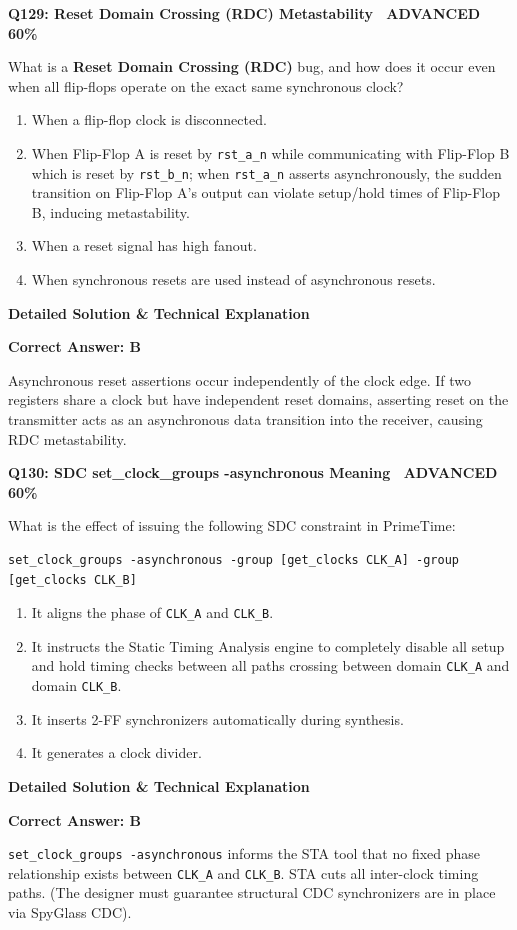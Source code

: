 \documentclass[11pt,a4paper]{article}
\newcommand{\badgeadv}{{\color{white}\colorbox{advred}{\bfseries\sffamily\tiny\ ADVANCED 60\%\ }}}
\newenvironment{qbox}[2]{%
  \begin{mdframed}[style=qstyle]%
  {\bfseries\sffamily\color{primaryblue}#1 \hfill #2}\par\vspace{2pt}%
}{%
  \end{mdframed}%
}
\newenvironment{ansbox}{%
  \begin{mdframed}[style=ansstyle]%
  {\bfseries\sffamily\color{ansgreen}\small Detailed Solution \& Technical Explanation}\par\vspace{2pt}\small%
}{%
  \end{mdframed}%
}
\begin{document}
\begin{qbox}{Q129: Reset Domain Crossing (RDC) Metastability}{\badgeadv}
What is a \textbf{Reset Domain Crossing (RDC)} bug, and how does it occur even when all flip-flops operate on the exact same synchronous clock?
\begin{enumerate}[label=\textbf{\Alph*.}]
  \item When a flip-flop clock is disconnected.
  \item When Flip-Flop A is reset by \texttt{rst\_a\_n} while communicating with Flip-Flop B which is reset by \texttt{rst\_b\_n}; when \texttt{rst\_a\_n} asserts asynchronously, the sudden transition on Flip-Flop A's output can violate setup/hold times of Flip-Flop B, inducing metastability.
  \item When a reset signal has high fanout.
  \item When synchronous resets are used instead of asynchronous resets.
\end{enumerate}
\end{qbox}
\begin{ansbox}
\textbf{Correct Answer: B}

Asynchronous reset assertions occur independently of the clock edge. If two registers share a clock but have independent reset domains, asserting reset on the transmitter acts as an asynchronous data transition into the receiver, causing RDC metastability.
\end{ansbox}

\begin{qbox}{Q130: SDC set\_clock\_groups -asynchronous Meaning}{\badgeadv}
What is the effect of issuing the following SDC constraint in PrimeTime:
\begin{lstlisting}[style=tclstyle]
set_clock_groups -asynchronous -group [get_clocks CLK_A] -group [get_clocks CLK_B]
\end{lstlisting}
\begin{enumerate}[label=\textbf{\Alph*.}]
  \item It aligns the phase of \texttt{CLK\_A} and \texttt{CLK\_B}.
  \item It instructs the Static Timing Analysis engine to completely disable all setup and hold timing checks between all paths crossing between domain \texttt{CLK\_A} and domain \texttt{CLK\_B}.
  \item It inserts 2-FF synchronizers automatically during synthesis.
  \item It generates a clock divider.
\end{enumerate}
\end{qbox}
\begin{ansbox}
\textbf{Correct Answer: B}

\texttt{set\_clock\_groups -asynchronous} informs the STA tool that no fixed phase relationship exists between \texttt{CLK\_A} and \texttt{CLK\_B}. STA cuts all inter-clock timing paths. (The designer must guarantee structural CDC synchronizers are in place via SpyGlass CDC).
\end{ansbox}
\end{document}
